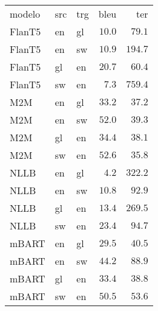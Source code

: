 \begin{tabular}{lllrr}
modelo & src & trg & bleu & ter \\
FlanT5 & en & gl & $10.0$ & $79.1$ \\
FlanT5 & en & sw & $10.9$ & $194.7$ \\
FlanT5 & gl & en & $20.7$ & $60.4$ \\
FlanT5 & sw & en & $7.3$ & $759.4$ \\
M2M & en & gl & $33.2$ & $37.2$ \\
M2M & en & sw & $52.0$ & $39.3$ \\
M2M & gl & en & $34.4$ & $38.1$ \\
M2M & sw & en & $52.6$ & $35.8$ \\
NLLB & en & gl & $4.2$ & $322.2$ \\
NLLB & en & sw & $10.8$ & $92.9$ \\
NLLB & gl & en & $13.4$ & $269.5$ \\
NLLB & sw & en & $23.4$ & $94.7$ \\
mBART & en & gl & $29.5$ & $40.5$ \\
mBART & en & sw & $44.2$ & $88.9$ \\
mBART & gl & en & $33.4$ & $38.8$ \\
mBART & sw & en & $50.5$ & $53.6$ \\
\end{tabular}
